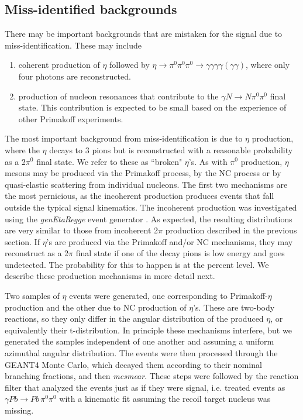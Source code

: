 \subsection{Miss-identified backgrounds}

There may be important backgrounds that are mistaken for the signal
due to miss-identification. These may include

\begin{enumerate}[label=(\roman*)]
    \item coherent production of $\eta$ followed by $\eta\rightarrow
      \pi^0\pi^0\pi^0 \rightarrow
      \gamma\gamma\gamma\gamma(\gamma\gamma)$, where only four photons
      are reconstructed.
    \item production of nucleon resonances that contribute to the
      $\gamma N \rightarrow N \pi^0\pi^0$ final state. This
      contribution is expected to be small based on the experience of
      other Primakoff experiments.
\end{enumerate}
The most important background from miss-identification is due to
$\eta$ production, where the $\eta$ decays to 3 pions but is
reconstructed with a reasonable probability as a 2$\pi^0$ final
state. We refer to these as ``broken" $\eta$'s. As with $\pi^0$
production, $\eta$ mesons may be produced via the Primakoff process,
by the NC process or by quasi-elastic scattering from individual
nucleons. The first two mechanisms are the most pernicious, as the
incoherent production produces events that fall outside the typical
signal kinematics.  The incoherent production was investigated using
the {\em genEtaRegge} event generator \cite{hdnote2437}. As expected,
the resulting distributions are very similar to those from incoherent
2$\pi$ production described in the previous section.  If $\eta$'s are
produced via the Primakoff and/or NC mechanisms, they may reconstruct
as a 2$\pi$ final state if one of the decay pions is low energy and
goes undetected. The probability for this to happen is at the percent
level.  We describe these production mechanisms in more detail next.

Two samples of $\eta$ events were generated, one corresponding to
Primakoff-$\eta$ production and the other due to NC production of
$\eta$'s. These are two-body reactions, so they only differ in the
angular distribution of the produced $\eta$, or equivalently their
t-distribution. In principle these mechanisms interfere, but we
generated the samples independent of one another and assuming a
uniform azimuthal angular distribution. The events were then processed
through the GEANT4 Monte Carlo, which decayed them according to their
nominal branching fractions, and then {\em mcsmear}. These steps were
followed by the reaction filter that analyzed the events just as if
they were signal, i.e. treated events as $\gamma Pb \rightarrow Pb\,
\pi^0 \pi^0$ with a kinematic fit assuming the recoil target nucleus
was missing.

